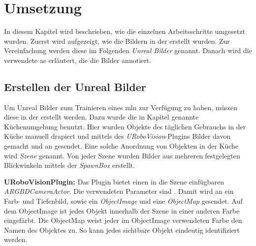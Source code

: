 \graphicspath{{./images/}}      
\def\CHAPTERONE{./chapters/Chapter-1} 

\chapter{Umsetzung}
\label{chap:implementation}
%	

In diesem Kapitel wird beschrieben, wie die einzelnen Arbeitsschritte umgesetzt wurden. Zuerst wird aufgezeigt, wie die Bildern in der \unreal erstellt wurden. Zur Vereinfachung werden diese  im Folgenden \textit{Unreal Bilder} genannt. Danach wird die verwendete \gls{ae} erläutert, die die Bilder annotiert. 

\section{Erstellen der Unreal Bilder}
\label{sec:takingpics}
Um Unreal Bilder zum Trainieren eines \gls{mln} zur Verfügung zu haben, müssen diese in der \unreal erstellt werden. Dazu wurde die in Kapitel  genannte Küchenumgebung benutzt. Hier wurden Objekte des täglichen Gebrauchs in der Küche manuell drapiert und mittels des \textit{URoboVision}-Plugins Bilder davon gemacht und an \robosherlock gesendet. Eine solche Anordnung von Objekten in der Küche wird \textit{Szene} genannt. Von jeder Szene wurden Bilder aus mehreren festgelegten Blickwinkeln mittels der \textit{SpawnBox} erstellt. \par 

\textbf{URoboVisionPlugin:} Das Plugin bietet einen in die Szene einfügbaren \textit{ARGBDCameraActor}. Die verwendeten Parameter sind . Damit wird an \robosherlock ein Farb- und Tiefenbild, sowie ein \textit{ObjectImage} und eine \textit{ObjectMap} gesendet. Auf dem ObjectImage ist jedes Objekt innerhalb der Szene in einer anderen Farbe eingefärbt. Die ObjectMap weist jeder im ObjectImage verwendeten Farbe den Namen des Objektes zu. So kann jedes sichtbare Objekt eindeutig identifiziert werden.   \par 

